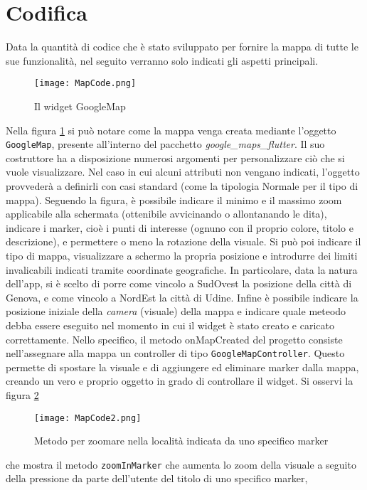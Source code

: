 \section{Codifica}
Data la quantità di codice che è stato sviluppato per fornire la mappa di tutte
le sue funzionalità, nel seguito verranno solo indicati gli aspetti principali. \\
\begin{figure}[!h]
    \centering
    \texttt{[image: MapCode.png]}
    \caption{Il widget GoogleMap}
    \label{mapcode1}
\end{figure}
Nella figura \ref{mapcode1} si può notare come la mappa venga creata mediante
l'oggetto \verb|GoogleMap|, presente all'interno del pacchetto
\textit{google\_maps\_flutter}. Il suo costruttore ha a disposizione numerosi
argomenti per personalizzare ciò che si vuole visualizzare. Nel caso in cui
alcuni attributi non vengano indicati, l'oggetto provvederà a definirli con casi
standard (come la tipologia Normale per il tipo di mappa). Seguendo la figura, è
possibile indicare il minimo e il massimo zoom applicabile alla schermata
(ottenibile avvicinando o allontanando le dita), indicare i marker, cioè i punti
di interesse (ognuno con il proprio colore, titolo e descrizione), e permettere
o meno la rotazione della visuale. Si può poi indicare il tipo di mappa,
visualizzare a schermo la propria posizione e introdurre dei limiti invalicabili
indicati tramite coordinate geografiche. In particolare, data la natura
dell'app, si è scelto di porre come vincolo a SudOvest la posizione della città
di Genova, e come vincolo a NordEst la città di Udine. Infine è possibile
indicare la posizione iniziale della \textit{camera} (visuale) della
mappa e indicare quale meteodo debba essere eseguito nel momento in cui il
widget è stato creato e caricato correttamente. Nello specifico, il metodo
onMapCreated del progetto consiste nell'assegnare alla mappa un controller di
tipo \verb|GoogleMapController|. Questo permette di spostare la visuale e di
aggiungere ed eliminare marker dalla mappa, creando un vero e proprio oggetto in
grado di controllare il widget. Si osservi la figura \ref{mapcode2}
\begin{figure}[!h]
    \centering
    \texttt{[image: MapCode2.png]}
    \caption{Metodo per zoomare nella località indicata da uno specifico marker}
    \label{mapcode2}
\end{figure} 
che mostra il metodo \verb|zoomInMarker| che aumenta lo zoom della visuale a
seguito della pressione da parte dell'utente del titolo di uno specifico marker,
